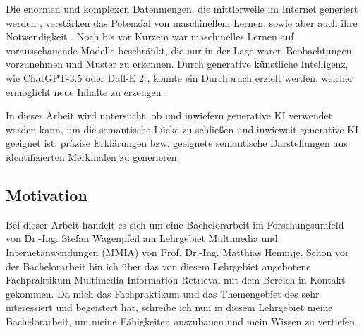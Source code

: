 Die enormen und komplexen Datenmengen, die mittlerweile im Internet generiert werden \cite{global-mobile-data-usage}, verstärken das Potenzial von maschinellem Lernen, sowie aber auch ihre Notwendigkeit \cite{mckinsey-generative-ai}.
Noch bis vor Kurzem war maschinelles Lernen auf vorausschauende Modelle beschränkt, die nur in der Lage waren Beobachtungen vorzunehmen und Muster zu erkennen.
Durch generative künstliche Intelligenz, wie ChatGPT-3.5 \cite{chatgpt} oder Dall-E 2 \cite{dall-e-2}, konnte ein Durchbruch erzielt werden, welcher ermöglicht neue Inhalte zu erzeugen \cite{mckinsey-generative-ai}.

In dieser Arbeit wird untersucht, ob und inwiefern generative KI verwendet werden kann, um die semantische Lücke zu schließen und inwieweit generative KI geeignet ist, präzise Erklärungen bzw. geeignete semantische Darstellungen aus identifizierten Merkmalen zu generieren.


\subsection{Motivation}
\label{sec1:intro:subsec:motivation}
Bei dieser Arbeit handelt es sich um eine Bachelorarbeit im Forschungsumfeld von Dr.-Ing. Stefan Wagenpfeil am Lehrgebiet Multimedia und Internetanwendungen (MMIA) von Prof. Dr.-Ing. Matthias Hemmje.
Schon vor der Bachelorarbeit bin ich über das von diesem Lehrgebiet angebotene Fachpraktikum Multimedia Information Retrieval mit dem Bereich \mmir{} in Kontakt gekommen.
Da mich das Fachpraktikum und das Themengebiet des \mmir{} sehr interessiert und begeistert hat, schreibe ich nun in diesem Lehrgebiet meine Bachelorarbeit, um meine Fähigkeiten auszubauen und mein Wissen zu vertiefen.

